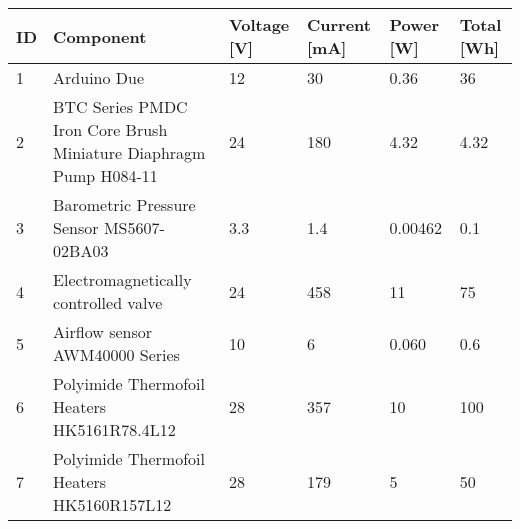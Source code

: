 \begin{longtable}{|m{}| m{} |m{} |m{}|m{}| m{} |}
\hline
\textbf{ID}             & \textbf{Component}                                                   & \textbf{Voltage {[}V{]}} & \textbf{Current {[}mA{]}} & \textbf{Power {[}W{]}} & \textbf{Total {[}Wh{]}} \\ \hline
1                       & Arduino Due                                       & 12                                          & 30                                           & 0.36                                      & 36                                         \\ \hline
2                       & BTC Series PMDC Iron Core Brush Miniature Diaphragm Pump H084-11                         & 24                                          & 180                                         & 4.32                                      & 4.32                                       \\ \hline
3                       & Barometric Pressure Sensor MS5607-02BA03          & 3.3                                         & 1.4                                          & 0.00462                                   & 0.1                                        \\ \hline
4                       & Electromagnetically controlled valve              & 24                                          & 458                                          & 11                                        & 75                                         \\ \hline
5                       & Airflow sensor AWM40000 Series                    & 10                                          & 6                                            & 0.060                                     & 0.6                                        \\ \hline
6                       & Polyimide Thermofoil Heaters HK5161R78.4L12       & 28                                          & 357                                          & 10                                        & 100                                        \\ \hline
7                       & Polyimide Thermofoil Heaters HK5160R157L12        & 28                                          & 179                                          & 5                                         & 50                                         \\ \hline

\end{longtable}
